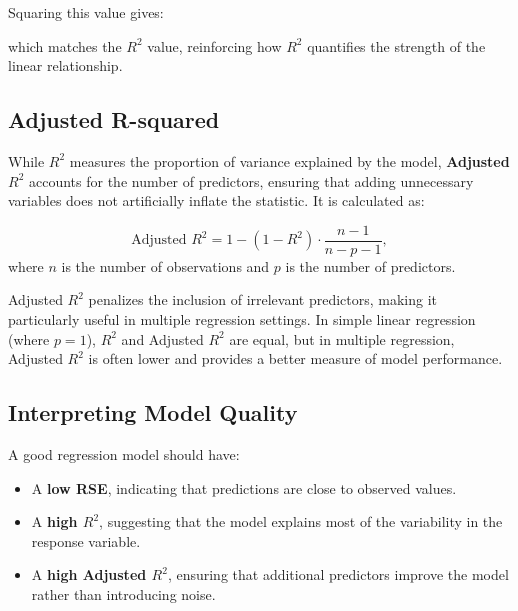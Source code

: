 \documentclass[
  11pt,
]{book}
\makeatletter
\newenvironment{Shaded}{}{}
\newcommand{\DecValTok}[1]{#1}
\newcommand{\FloatTok}[1]{#1}
\newcommand{\FunctionTok}[1]{#1}
\newcommand{\NormalTok}[1]{#1}
\newcommand{\SpecialCharTok}[1]{\textcolor[rgb]{0.39,0.39,0.39}{#1}}
\providecommand{\tightlist}{%
  \setlength{\itemsep}{0pt}\setlength{\parskip}{0pt}}
\newenvironment{kframe}{%
\medskip{}
\setlength{\fboxsep}{.8em}
 \def\at@end@of@kframe{}%
 \ifinner\ifhmode%
  \def\at@end@of@kframe{\end{minipage}}%
  \begin{minipage}{\columnwidth}%
 \fi\fi%
 \def\FrameCommand##1{\hskip\@totalleftmargin \hskip-\fboxsep
 \colorbox{shadecolor}{##1}\hskip-\fboxsep
     \hskip-\linewidth \hskip-\@totalleftmargin \hskip\columnwidth}%
 \MakeFramed {\advance\hsize-\width
   \@totalleftmargin\z@ \linewidth\hsize
   \@setminipage}}%
 {\par\unskip\endMakeFramed%
 \at@end@of@kframe}
\renewenvironment{Shaded}{\begin{kframe}}{\end{kframe}}
\theoremstyle{definition}
\theoremstyle{definition}
\theoremstyle{definition}
\theoremstyle{definition}
\theoremstyle{remark}
\makeatother
\begin{document}
Squaring this value gives:

\begin{Shaded}
\end{Shaded}

which matches the \(R^2\) value, reinforcing how \(R^2\) quantifies the strength of the linear relationship.

\subsection*{Adjusted R-squared}\label{adjusted-r-squared}


While \(R^2\) measures the proportion of variance explained by the model, \textbf{Adjusted \(R^2\)} accounts for the number of predictors, ensuring that adding unnecessary variables does not artificially inflate the statistic. It is calculated as:

\[
\text{Adjusted } R^2 = 1 - \left(1 - R^2\right) \cdot \frac{n-1}{n-p-1},
\]
where \(n\) is the number of observations and \(p\) is the number of predictors.

Adjusted \(R^2\) penalizes the inclusion of irrelevant predictors, making it particularly useful in multiple regression settings. In simple linear regression (where \(p = 1\)), \(R^2\) and Adjusted \(R^2\) are equal, but in multiple regression, Adjusted \(R^2\) is often lower and provides a better measure of model performance.

\subsection*{Interpreting Model Quality}\label{interpreting-model-quality}


A good regression model should have:

\begin{itemize}
\tightlist
\item
  A \textbf{low RSE}, indicating that predictions are close to observed values.\\
\item
  A \textbf{high \(R^2\)}, suggesting that the model explains most of the variability in the response variable.\\
\item
  A \textbf{high Adjusted \(R^2\)}, ensuring that additional predictors improve the model rather than introducing noise.
\end{itemize}
\end{document}
